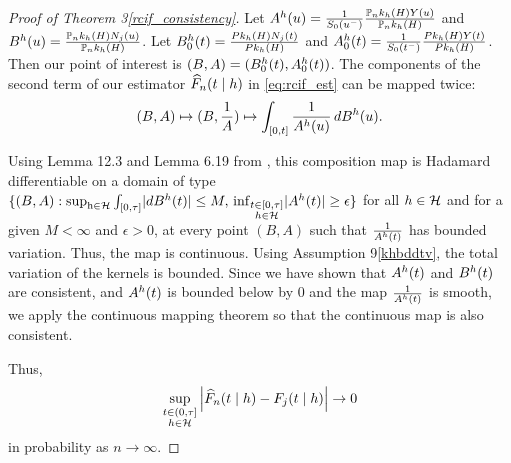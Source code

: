 {\begin{proof}[Proof of Theorem \ifnum{} 3\else \ref{rcif_consistency}\fi]

Let $A^h(u) = \frac{1}{S_0(u^-)}\frac{\mathbb{P}_nk_h(H)Y(u)}{\mathbb{P}_nk_h(H)}$ and $B^h(u) = \frac{\mathbb{P}_nk_h(H)N_j(u)}{\mathbb{P}_nk_h(H)}$. Let $B^h_0(t)= \frac{Pk_h(H) N_j(t)}{Pk_h(H)}$ and $A^h_0(t) = \frac{1}{S_0(t^-)} \frac{Pk_h(H) Y (t)}{Pk_h(H)}$. Then our point of interest is $(B,A) = (B^h_0(t),A^h_0(t))$. The components of the second term of our estimator $\widehat{F}_n(t\mid h)$ in \cref{eq:rcif_est} can be mapped twice:
\begin{align*}
    (B,A) \mapsto (B,\frac{1}{A}) \mapsto \int_{[0,t]} \frac{1}{A^h(u)}\,dB^h (u).
\end{align*}

Using Lemma 12.3 and Lemma 6.19 from \cite{kosorok_introduction_2008}, this composition map is Hadamard differentiable on a domain of type 
$\{ (B,A) :
\operatorname*{\sup_{h \in \mathcal{H}}}\int_{[0,\tau]} \lvert dB^h(t) \rvert \leq M,\\
\inf_{\substack{t \in [0, \tau] \\ h \in \mathcal{H}}} \lvert A^h(t) \rvert \geq \epsilon \}$ 
for all $h \in \mathcal{H}$ and for a given \( M < \infty \) and \( \epsilon > 0 \), at every point \((B,A)\) such that \( \frac{1}{A^h(t)} \) has bounded variation. Thus, the map is continuous. Using Assumption \ifnum{} 9\else \ref{khbddtv}\fi, the total variation of the kernels is bounded. Since we have shown that $A^h(t)$ and $B^h(t)$ are consistent, and $A^h(t)$ is bounded below by $0$ and the map $\frac{1}{A^h(t)}$ is smooth, we apply the continuous mapping theorem so that the continuous map is also consistent.

Thus,
\begin{equation*}
\operatorname*{\sup_{\substack{t\in(0,\tau] \\ h \in \mathcal{H}}}} \left\lvert\widehat{F}_n (t\mid h) - F_j (t\mid h)\right\rvert \to 0
\end{equation*}
in probability as $n \to \infty$.


\end{proof}}
